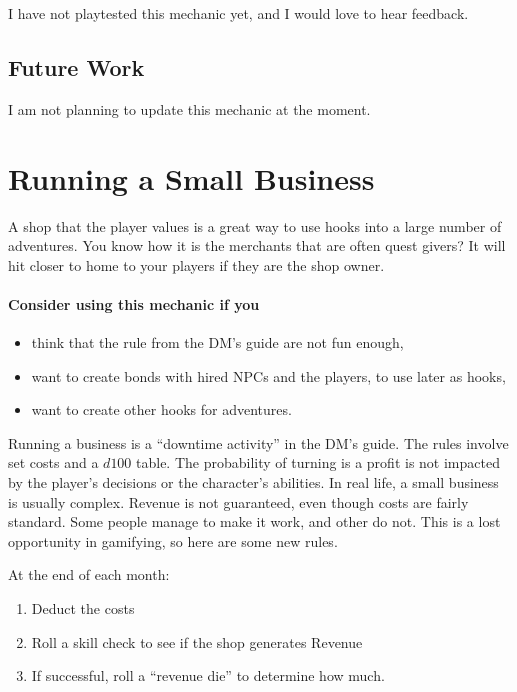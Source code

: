 \documentclass[twocolumn]{dndbook}
\begin{document}
I have not playtested this mechanic yet, and I would love to hear feedback.

\subsection{Future Work}

I am not planning to update this mechanic at the moment.


\section{Running a Small Business}

\begin{emphasisParagraph}
	A shop that the player values is a great way to use hooks into a large number of adventures.
	You know how it is the merchants that are often quest givers?
	It will hit closer to home to your players if they are the shop owner.
	\paragraph*{Consider using this mechanic if you}
	\begin{itemize}
    \item think that the rule from the DM's guide are not fun enough,
    \item want to create bonds with hired NPCs and the players, to use later as hooks,
    \item want to create other hooks for adventures.
    \end{itemize}
\end{emphasisParagraph}


Running a business is a ``downtime activity'' in the DM's guide.
The rules involve set costs and a $d100$ table.
The probability of turning is a profit is not impacted by the player's decisions or the character's abilities.
In real life, a small business is usually complex.
Revenue is not guaranteed, even though costs are fairly standard.
Some people manage to make it work, and other do not.
This is a lost opportunity in gamifying, so here are some new rules.\par

At the end of each month:
\begin{enumerate}
	\item Deduct the costs
	\item Roll a skill check to see if the shop generates Revenue
	\item If successful, roll a ``revenue die'' to determine how much.
\end{enumerate}
\end{document}
